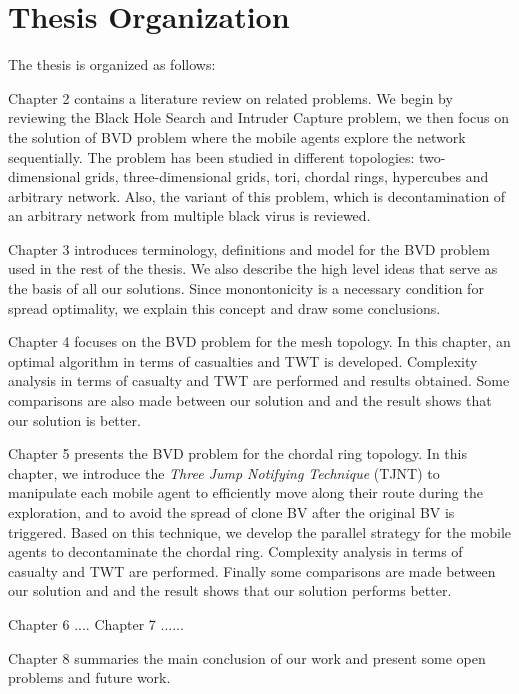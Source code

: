 
\section{Thesis Organization} 

The thesis is organized as follows:

Chapter 2 contains a literature review on related problems. We begin by reviewing the Black Hole Search and Intruder Capture problem, we then focus on the solution of BVD problem where the mobile agents explore the network sequentially. The problem has been studied in different topologies: two-dimensional grids, three-dimensional grids, tori, chordal rings, hypercubes and arbitrary network. Also, the variant of this problem, which is decontamination of an arbitrary network from multiple black virus is   reviewed. 

Chapter 3 introduces terminology, definitions and model for the BVD problem used in the rest of the thesis.   We also describe the high level ideas that serve as the basis of all our solutions. Since monontonicity is a necessary condition for spread optimality, we explain this concept  and draw some  conclusions.

Chapter 4 focuses on the BVD problem for the mesh topology. In this chapter, an optimal algorithm in terms of casualties and TWT is developed. Complexity analysis in terms of casualty and TWT are performed and results obtained. Some comparisons  are also made between our solution and \cite{cai} and the result shows that our solution is better.

Chapter 5 presents the BVD problem for the chordal ring topology. In this chapter, we introduce the {\em Three Jump Notifying Technique} (TJNT) to manipulate each mobile agent to efficiently move along their route during the exploration,   and to avoid  the spread of clone BV after the original BV is triggered. Based on this technique, we develop the parallel strategy for the mobile agents to decontaminate the chordal ring. Complexity analysis in terms of casualty and TWT are performed. Finally some comparisons are made between our solution and \cite{alotaibi} and the result shows that our solution performs better.

\color{blue}
Chapter 6 ....
Chapter 7 ......
 \color{black}

Chapter 8 summaries the main conclusion of our work and present some open problems and future work.
  



